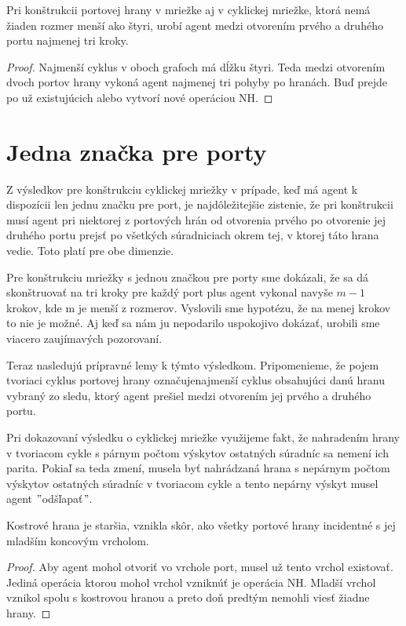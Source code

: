 \begin{lem}
Pri konštrukcii portovej hrany v mriežke aj v cyklickej mriežke, ktorá
nemá žiaden rozmer menší ako štyri, 
urobí agent medzi otvorením prvého a druhého
portu najmenej tri kroky.
\end{lem}
\begin{proof}
Najmenší cyklus v oboch grafoch má dĺžku štyri. 
Teda medzi otvorením dvoch portov
hrany vykoná agent najmenej tri pohyby po hranách. Buď prejde po už
existujúcich alebo vytvorí nové operáciou NH.
\end{proof}

\section{Jedna značka pre porty}

Z výsledkov pre konštrukciu cyklickej mriežky v prípade, keď má agent k
dispozícii len jednu značku pre port, je najdôležitejšie zistenie, že pri
konštrukcii musí agent pri niektorej z portových hrán od otvorenia prvého po
otvorenie jej druhého portu prejsť po všetkých súradniciach okrem tej, v
ktorej táto hrana vedie. Toto platí pre obe dimenzie.

Pre konštrukciu mriežky s jednou značkou pre porty sme dokázali, že sa dá
skonštruovať na tri kroky pre každý port plus agent vykonal navyše $m-1$
krokov, kde m je menší z rozmerov. Vyslovili sme hypotézu, že na menej
krokov to nie je možné. Aj keď sa nám ju nepodarilo uspokojivo dokázať,
urobili sme viacero zaujímavých pozorovaní.

Teraz nasledujú prípravné lemy k týmto výsledkom. Pripomenieme, že pojem
tvoriaci cyklus portovej hrany označujenajmenší cyklus obsahujúci danú hranu
vybraný zo sledu, ktorý agent prešiel medzi otvorením jej prvého a druhého
portu.

Pri dokazovaní výsledku o cyklickej mriežke využijeme fakt, že nahradením
hrany v tvoriacom cykle s párnym počtom výskytov ostatných súradníc sa nemení 
ich parita. Pokiaľ sa teda zmení, musela byť nahrádzaná hrana s nepárnym
počtom výskytov ostatných súradníc v tvoriacom cykle a tento nepárny výskyt
musel agent $"$odšľapať$"$.


\begin{lem}
Kostrové hrana je staršia, vznikla skôr, ako všetky portové hrany incidentné
s jej mladším koncovým vrcholom.
\end{lem}
\begin{proof}
Aby agent mohol otvoriť vo vrchole port, musel už tento vrchol existovať.
Jediná operácia ktorou mohol vrchol vzniknúť je operácia NH. Mladší vrchol
vznikol spolu s kostrovou hranou a preto doň predtým nemohli viesť žiadne
hrany.
\end{proof}


